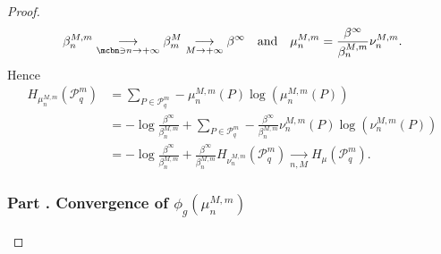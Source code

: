 \begin{proof}
\[
\beta_n^{M,m} \underset{\mcbn \ni n \to +\infty}{\longrightarrow} \beta_m^M \underset{M \to +\infty}{\longrightarrow} \beta^{\infty} \quad\text{and} \quad \mu_n^{M,m} = \frac{\beta^{\infty}}{\beta_n^{M,m}} \nu_n^{M,m}.
\]
Hence\vspace*{-3pt}
\begin{align*}
H_{\mu_n^{M,m}}(\mathcal{P}_q^m)
&= \sum_{P \in \mathcal{P}_q^m} - \mu_n^{M,m}(P) \log(\mu_n^{M,m}(P))\\[-3pt]
&= - \log \frac{\beta^{\infty}}{\beta_n^{M,m}} + \sum_{P \in \mathcal{P}_q^m} - \frac{\beta^{\infty}}{\beta_n^{M,m}} \nu_n^{M,m}(P) \log(\nu_n^{M,m}(P))\\[-1pt]
&= - \log \frac{\beta^{\infty}}{\beta_n^{M,m}} + \frac{\beta^{\infty}}{\beta_n^{M,m}} H_{\nu_n^{M,m}}(\mathcal{P}_q^m)\underset{n,M}{\longrightarrow} H_{\mu}(\mathcal{P}_q^m).
\end{align*}

\label{part3}
\subsubsection*{Part \thesubsubsection. Convergence of $\phi_g(\mu_n^{M,m})$}


\end{proof}
